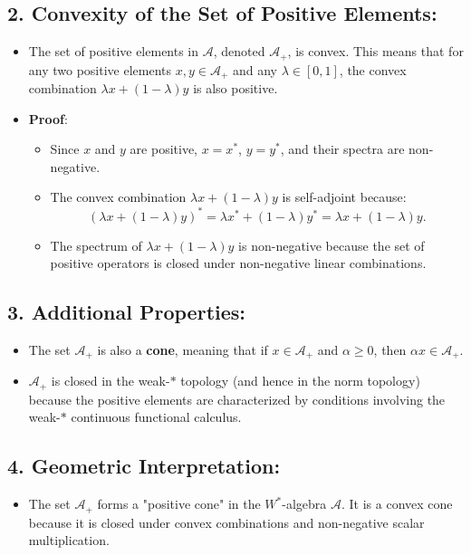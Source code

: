 \documentclass{article}
\begin{document}
\subsection*{2. Convexity of the Set of Positive Elements:}
\begin{itemize}
    \item The set of positive elements in \( \mathcal{A} \), denoted \( \mathcal{A}_+ \), is convex. This means that for any two positive elements \( x, y \in \mathcal{A}_+ \) and any \( \lambda \in [0, 1] \), the convex combination \( \lambda x + (1 - \lambda) y \) is also positive.
    \item \textbf{Proof}:
    \begin{itemize}
        \item Since \( x \) and \( y \) are positive, \( x = x^* \), \( y = y^* \), and their spectra are non-negative.
        \item The convex combination \( \lambda x + (1 - \lambda) y \) is self-adjoint because:
        \[
        (\lambda x + (1 - \lambda) y)^* = \lambda x^* + (1 - \lambda) y^* = \lambda x + (1 - \lambda) y.
        \]
        \item The spectrum of \( \lambda x + (1 - \lambda) y \) is non-negative because the set of positive operators is closed under non-negative linear combinations.
    \end{itemize}
\end{itemize}

\subsection*{3. Additional Properties:}
\begin{itemize}
    \item The set \( \mathcal{A}_+ \) is also a \textbf{cone}, meaning that if \( x \in \mathcal{A}_+ \) and \( \alpha \geq 0 \), then \( \alpha x \in \mathcal{A}_+ \).
    \item \( \mathcal{A}_+ \) is closed in the weak-\( * \) topology (and hence in the norm topology) because the positive elements are characterized by conditions involving the weak-\( * \) continuous functional calculus.
\end{itemize}

\subsection*{4. Geometric Interpretation:}
\begin{itemize}
    \item The set \( \mathcal{A}_+ \) forms a "positive cone" in the \( W^* \)-algebra \( \mathcal{A} \). It is a convex cone because it is closed under convex combinations and non-negative scalar multiplication.
\end{itemize}
\end{document}

